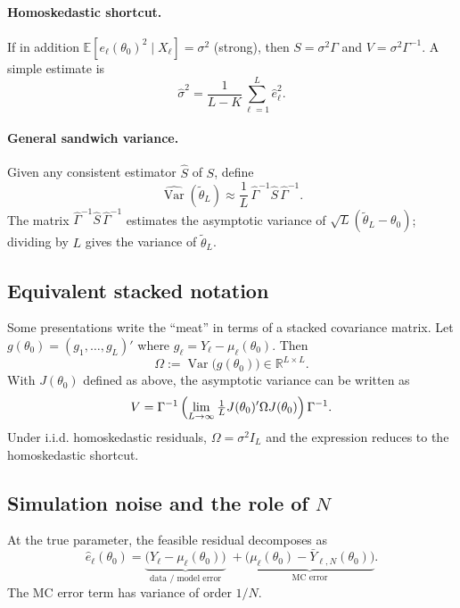 \documentclass[11pt]{article}
\newcommand{\E}{\mathbb{E}}
\newcommand{\Var}{\operatorname{Var}}
\newcommand{\R}{\mathbb{R}}
\begin{document}
\paragraph{Homoskedastic shortcut.}
If in addition $\E[e_\ell(\theta_0)^2 \mid X_\ell] = \sigma^2$ (strong), then
$S=\sigma^2\Gamma$ and $V=\sigma^2\Gamma^{-1}$. A simple estimate is
\begin{equation}
\hat\sigma^2 = \frac{1}{L-K}\sum_{\ell=1}^L \hat e_\ell^2.
\label{eq:sigma2hat}
\end{equation}

\paragraph{General sandwich variance.}
Given any consistent estimator $\hat S$ of $S$, define
\begin{equation}
\widehat{\Var}(\tilde\theta_L)
\approx \frac{1}{L}\, \hat\Gamma^{-1} \hat S\, \hat\Gamma^{-1}.
\label{eq:varhat_general}
\end{equation}
The matrix $\hat\Gamma^{-1} \hat S\, \hat\Gamma^{-1}$ estimates the asymptotic
variance of $\sqrt{L}(\tilde\theta_L-\theta_0)$; dividing by $L$ gives the
variance of $\tilde\theta_L$.

\subsection{Equivalent stacked notation}

Some presentations write the ``meat'' in terms of a stacked covariance matrix.
Let $g(\theta_0)=(g_1,\ldots,g_L)'$ where $g_\ell = Y_\ell-\mu_\ell(\theta_0)$.
Then
\[
\Omega := \Var\bigl(g(\theta_0)\bigr) \in \R^{L\times L}.
\]
With $J(\theta_0)$ defined as above, the asymptotic variance can be written as
\[
V = \Gamma^{-1}\, \Bigl(\lim_{L\to\infty} \tfrac{1}{L}J(\theta_0)'\Omega J(\theta_0)\Bigr)\, \Gamma^{-1}.
\]
Under i.i.d. homoskedastic residuals, $\Omega=\sigma^2 I_L$ and the expression
reduces to the homoskedastic shortcut.

\subsection{Simulation noise and the role of $N$}

At the true parameter, the feasible residual decomposes as
\[
\hat e_\ell(\theta_0)
= \underbrace{\bigl(Y_\ell - \mu_\ell(\theta_0)\bigr)}_{\text{data / model error}}
\;+
\underbrace{\bigl(\mu_\ell(\theta_0) - \bar Y_{\ell,N}(\theta_0)\bigr)}_{\text{MC error}}.
\]
The MC error term has variance of order $1/N$.
\end{document}
